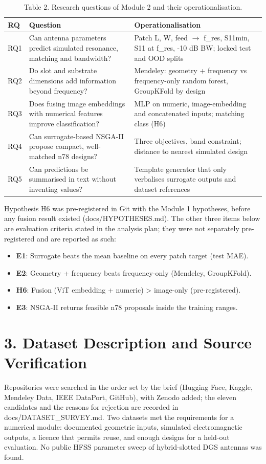 \documentclass[11pt,a4paper]{article}
\begin{document}
\begin{table}[H]\centering\small
\caption*{Table 2. Research questions of Module 2 and their operationalisation.}
\begin{tabularx}{\linewidth}{XXX}
\toprule
\textbf{RQ} & \textbf{Question} & \textbf{Operationalisation} \\
\midrule
RQ1 & Can antenna parameters predict simulated resonance, matching and bandwidth? & Patch L, W, feed $\rightarrow$ f\_res, S11min, S11 at f\_res, -10 dB BW; locked test and OOD splits \\
RQ2 & Do slot and substrate dimensions add information beyond frequency? & Mendeley: geometry + frequency vs frequency-only random forest, GroupKFold by design \\
RQ3 & Does fusing image embeddings with numerical features improve classification? & MLP on numeric, image-embedding and concatenated inputs; matching class (H6) \\
RQ4 & Can surrogate-based NSGA-II propose compact, well-matched n78 designs? & Three objectives, band constraint; distance to nearest simulated design \\
RQ5 & Can predictions be summarised in text without inventing values? & Template generator that only verbalises surrogate outputs and dataset references \\
\bottomrule
\end{tabularx}
\end{table}
Hypothesis H6 was pre-registered in Git with the Module 1 hypotheses, before any fusion result existed (docs/HYPOTHESES.md). The other three items below are evaluation criteria stated in the analysis plan; they were not separately pre-registered and are reported as such:

\begin{itemize}[leftmargin=*,itemsep=1pt]
\item \textbf{E1}: Surrogate beats the mean baseline on every patch target (test MAE).
\item \textbf{E2}: Geometry + frequency beats frequency-only (Mendeley, GroupKFold).
\item \textbf{H6}: Fusion (ViT embedding + numeric) > image-only (pre-registered).
\item \textbf{E3}: NSGA-II returns feasible n78 proposals inside the training ranges.
\end{itemize}
\section*{3. Dataset Description and Source Verification}
Repositories were searched in the order set by the brief (Hugging Face, Kaggle, Mendeley Data, IEEE DataPort, GitHub), with Zenodo added; the eleven candidates and the reasons for rejection are recorded in docs/DATASET\_SURVEY.md. Two datasets met the requirements for a numerical module: documented geometric inputs, simulated electromagnetic outputs, a licence that permits reuse, and enough designs for a held-out evaluation. No public HFSS parameter sweep of hybrid-slotted DGS antennas was found.
\end{document}

